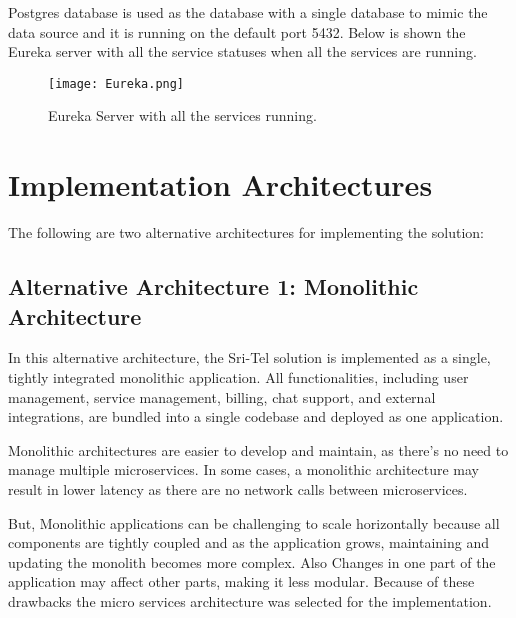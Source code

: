 \documentclass[12pt]{article}
\begin{document}
\par Postgres database is used as the database with a single database to mimic the data source and it is running on the default port 5432. Below is shown the Eureka server with all the service statuses when all the services are running.

\newpage    

\begin{figure}[H]
    \centering
    \texttt{[image: Eureka.png]}
    \caption{Eureka Server with all the services running.}
    \label{fig:your-figure-label}
\end{figure}




\section{Implementation Architectures}

The following are two alternative architectures for implementing the solution:

\subsection{Alternative Architecture 1: Monolithic Architecture}
\par In this alternative architecture, the Sri-Tel solution is implemented as a single, tightly integrated monolithic application. All functionalities, including user management, service management, billing, chat support, and external integrations, are bundled into a single codebase and deployed as one application.
\par Monolithic architectures are easier to develop and maintain, as there's no need to manage multiple microservices. In some cases, a monolithic architecture may result in lower latency as there are no network calls between microservices.
\par But, Monolithic applications can be challenging to scale horizontally because all components are tightly coupled and as the application grows, maintaining and updating the monolith becomes more complex. Also Changes in one part of the application may affect other parts, making it less modular. Because of these drawbacks the micro services architecture was selected for the implementation. 
\end{document}
